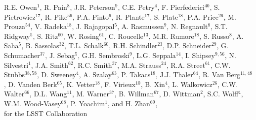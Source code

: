 {R.E. Owen$^1$,
R. Pain$^{8}$,
J.R. Peterson$^{9}$,
C.E. Petry$^{4}$,  
F. Pierfederici$^{40}$,
S. Pietrowicz$^{17}$,
R. Pike$^{59}$,
P.A. Pinto$^{6}$,   
R. Plante$^{17}$,
S. Plate$^{18}$, 
P.A. Price$^{26}$,
M. Prouza$^{54}$,
V. Radeka$^{18}$, 
J. Rajagopal$^5$,   
A. Rasmussen$^9$,
N. Regnault$^8$,  
S.T. Ridgway$^5$, 
S. Ritz$^{60}$, 
W. Rosing$^{61}$,
C. Roucelle$^{13}$, 
M.R. Rumore$^{18}$, 
S. Russo$^8$,  
A. Saha$^{5}$,     
B. Sassolas$^{32}$, 
T.L. Schalk$^{60}$,     
R.H. Schindler$^{23}$,
D.P. Schneider$^{29}$,    
G. Schumacher$^{37}$,
J. Sebag$^5$,
G.H. Sembroski$^9$, 
L.G. Seppala$^{14}$,
I. Shipsey$^{9,56}$,
N. Silvestri$^1$,
J.A. Smith$^{62}$,    
R.C. Smith$^{37}$,
M.A. Strauss$^{24}$,     
R.A. Street$^{61}$,     
C.W. Stubbs$^{38,58}$,
D. Sweeney$^4$,
A. Szalay$^{63}$,
P. Takacs$^{18}$, 
J.J. Thaler$^{64}$,
R. Van Berg$^{11,48}$, 
D. Vanden Berk$^{65}$,  
K. Vetter$^{18}$, 
F. Virieux$^{10}$, 
B. Xin$^4$,
L. Walkowicz$^{26}$,
C.W. Walter$^{66}$, 
D.L. Wang$^{11}$,
M. Warner$^{37}$,
B. Willman$^{67}$,
D. Wittman$^2$,
S.C. Wolff$^4$, 
W.M. Wood-Vasey$^{68}$,  
P. Yoachim$^1$,
and H. Zhan$^{69}$, \\
for the LSST Collaboration
}
\affil{}

